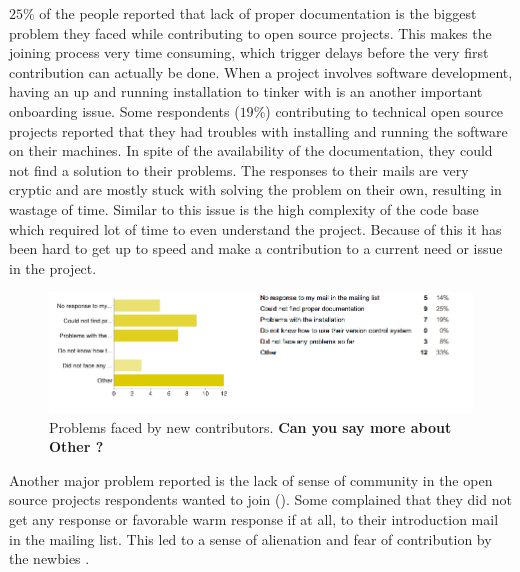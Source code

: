 $25\%$ of the people reported that lack of proper documentation is the biggest problem they faced while contributing to open source projects. This makes the joining process very time consuming, which trigger delays before the very first contribution can actually be done. When a project involves software development,  having an up and running installation to tinker with is an another important onboarding issue. Some respondents ($19\%$) contributing to technical open source projects reported that they had troubles with installing and running the software on their machines. In spite of the availability of the documentation, they could not find a solution to their problems. The responses to their mails are very cryptic and are mostly stuck with solving the problem on their own, resulting in wastage of time. Similar to this issue is the high complexity of the code base which required lot of time to even understand the project. Because of this it has been hard to get up to speed and make a contribution to a current need or issue in the project.

\begin{figure}[ht!]
\centering
\includegraphics[width=130mm]{chapters/img/problems_faced.png}
\caption{Problems faced by new contributors. {\bf Can you say more about Other ?}}
\label{fig:problem_faced}
\end{figure}

Another major problem reported is the lack of sense of community in the open source projects respondents wanted to join (). Some complained that they did not get any response or favorable warm response if at all, to their introduction mail in the mailing list. This led to a sense of alienation and fear of contribution by the newbies . 

